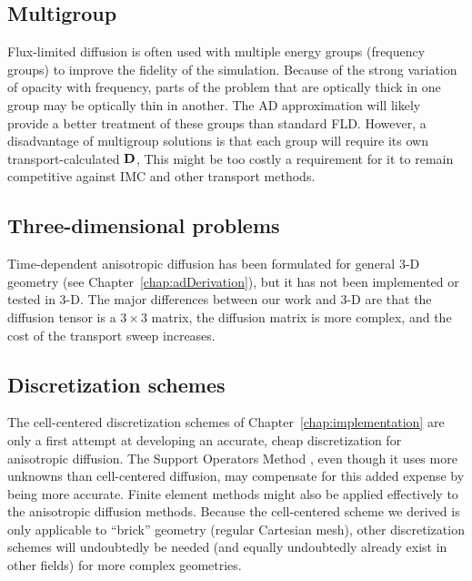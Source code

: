 \subsection{Multigroup}

Flux-limited diffusion is often used with multiple energy groups (frequency
groups) to improve the
fidelity of the simulation. Because of the strong variation of opacity with
frequency, parts of the problem that are optically thick in one group may be optically
thin in another. The AD approximation will likely provide a better treatment of
these groups than standard FLD. However, a disadvantage of multigroup solutions is that
each group will require its own transport-calculated $\mathbf{D}$, This might be
too costly a requirement for it to remain competitive against IMC and other
transport methods.

\subsection{Three-dimensional problems}

Time-dependent anisotropic diffusion has been formulated for general
3-D geometry (see Chapter~\ref{chap:adDerivation}), but it has not
been implemented or tested in 3-D. The major differences between our work
and 3-D are that the
diffusion tensor is a $3\times 3$ matrix, the diffusion matrix is more
complex, and the cost of the transport sweep increases.

\subsection{Discretization schemes}

The cell-centered discretization schemes of Chapter~\ref{chap:implementation}
are only a first attempt at developing an accurate, cheap discretization for
anisotropic diffusion. The Support Operators Method
\cite{Mor1998,Run2006}, even though it uses more unknowns than
cell-centered diffusion, may compensate for this added expense by being more accurate. Finite element
methods might also be applied effectively to the anisotropic diffusion methods.
Because the cell-centered scheme we derived is only applicable to ``brick''
geometry (regular Cartesian mesh), other discretization schemes will undoubtedly
be needed (and equally undoubtedly already exist in other fields) for more
complex geometries.

